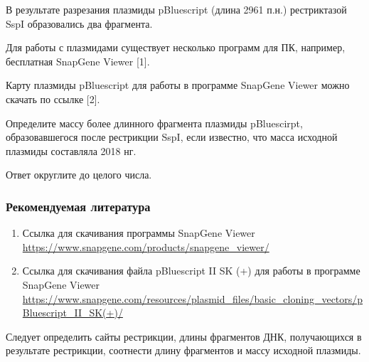 
В результате разрезания плазмиды pBluescript (длина 2961 п.н.) рестриктазой SspI образовались два фрагмента.

Для работы с плазмидами существует несколько программ для ПК, например, бесплатная SnapGene Viewer [1].

Карту плазмиды pBluescript для работы в программе SnapGene Viewer можно скачать по ссылке [2].

Определите массу более длинного фрагмента плазмиды pBluescirpt, образовавшегося после рестрикции SspI, если известно, что масса исходной плазмиды составляла 2018 нг.

Ответ округлите до целого числа. 

\subsubsection*{Рекомендуемая литература}

\begin{enumerate}
    \item Ссылка для скачивания программы SnapGene Viewer \url{https://www.snapgene.com/products/snapgene_viewer/}
    \item Ссылка для скачивания файла pBluescript II SK (+) для работы в программе SnapGene Viewer \url{https://www.snapgene.com/resources/plasmid_files/basic_cloning_vectors/pBluescript_II_SK(+)/}
\end{enumerate}

\explanationSection

Следует определить сайты рестрикции, длины фрагментов ДНК, получающихся в результате рестрикции, соотнести длину фрагментов и массу исходной плазмиды.

